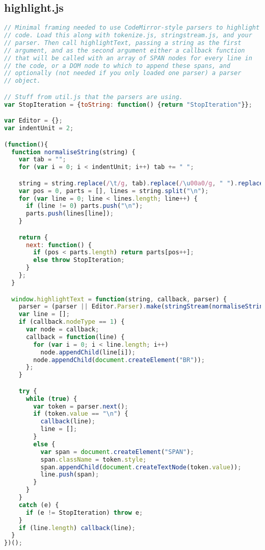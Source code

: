 \subsection{highlight.js}
\begin{lstlisting}[language=Javascript]
// Minimal framing needed to use CodeMirror-style parsers to highlight
// code. Load this along with tokenize.js, stringstream.js, and your
// parser. Then call highlightText, passing a string as the first
// argument, and as the second argument either a callback function
// that will be called with an array of SPAN nodes for every line in
// the code, or a DOM node to which to append these spans, and
// optionally (not needed if you only loaded one parser) a parser
// object.

// Stuff from util.js that the parsers are using.
var StopIteration = {toString: function() {return "StopIteration"}};

var Editor = {};
var indentUnit = 2;

(function(){
  function normaliseString(string) {
    var tab = "";
    for (var i = 0; i < indentUnit; i++) tab += " ";

    string = string.replace(/\t/g, tab).replace(/\u00a0/g, " ").replace(/\r\n?/g, "\n");
    var pos = 0, parts = [], lines = string.split("\n");
    for (var line = 0; line < lines.length; line++) {
      if (line != 0) parts.push("\n");
      parts.push(lines[line]);
    }

    return {
      next: function() {
        if (pos < parts.length) return parts[pos++];
        else throw StopIteration;
      }
    };
  }

  window.highlightText = function(string, callback, parser) {
    parser = (parser || Editor.Parser).make(stringStream(normaliseString(string)));
    var line = [];
    if (callback.nodeType == 1) {
      var node = callback;
      callback = function(line) {
        for (var i = 0; i < line.length; i++)
          node.appendChild(line[i]);
        node.appendChild(document.createElement("BR"));
      };
    }

    try {
      while (true) {
        var token = parser.next();
        if (token.value == "\n") {
          callback(line);
          line = [];
        }
        else {
          var span = document.createElement("SPAN");
          span.className = token.style;
          span.appendChild(document.createTextNode(token.value));
          line.push(span);
        }
      }
    }
    catch (e) {
      if (e != StopIteration) throw e;
    }
    if (line.length) callback(line);
  }
})();
\end{lstlisting}

